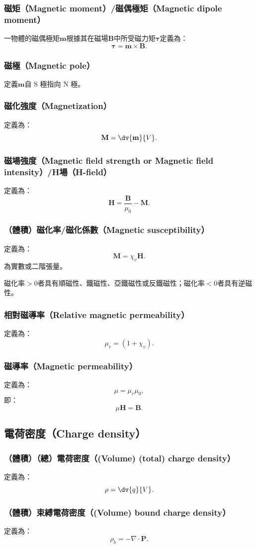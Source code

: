 \documentclass[a4paper,12pt]{report}
\begin{document}
\begin{itemize}
\subsubsection{磁矩（Magnetic moment）/磁偶極矩（Magnetic dipole moment）}
一物體的磁偶極矩$\mathbf{m}$根據其在磁場$\mathbf{B}$中所受磁力矩$\boldsymbol{\tau}$定義為：
\[\boldsymbol{\tau} = \mathbf{m} \times \mathbf{B}.\]
\subsubsection{磁極（Magnetic pole）}
定義$\mathbf{m}$自 S 極指向 N 極。
\subsubsection{磁化強度（Magnetization）}
定義為：
\[\mathbf{M} = \dv{\mathbf{m}}{V}.\]
\subsubsection{磁場強度（Magnetic field strength or Magnetic field intensity）/H場（H-field）}
定義為：
\[\mathbf{H} = \frac{\mathbf{B}}{\mu_0} - \mathbf{M}.\]
\subsubsection{（體積）磁化率/磁化係數（Magnetic susceptibility）}
定義為：
\[\mathbf{M}=\chi_v\mathbf{H}.\]
為實數或二階張量。

磁化率$>0$者具有順磁性、鐵磁性、亞鐵磁性或反鐵磁性；磁化率$<0$者具有逆磁性。
\subsubsection{相對磁導率（Relative magnetic permeability）}
定義為：
\[\mu_r=(1+\chi_v).\]
\subsubsection{磁導率（Magnetic permeability）}
定義為：
\[\mu=\mu_r\mu_0,\]
即：
\[\mu\mathbf{H}=\mathbf{B}.\]
\subsection{電荷密度（Charge density）}
\subsubsection{（體積）（總）電荷密度（(Volume) (total) charge density）}
定義為：
\[\rho = \dv{q}{V}.\]
\subsubsection{（體積）束縛電荷密度（(Volume) bound charge density）}
定義為：
\[\rho_b = -\nabla \cdot \mathbf{P}.\]

\end{itemize}
\end{document}
